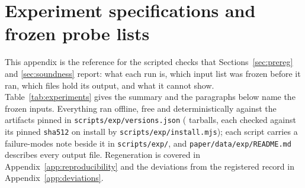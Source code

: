 \section{Experiment specifications and frozen probe lists}
\label{app:experiments}

This appendix is the reference for the scripted checks that Sections~\ref{sec:prereg} and \ref{sec:soundness} report: what each run is, which input list was frozen before it ran, which files hold its output, and what it cannot show. Table~\ref{tab:experiments} gives the summary and the paragraphs below name the frozen inputs. Everything ran offline, free and deterministically against the artifacts pinned in \texttt{scripts/exp/versions.json} (\expArtifacts{} tarballs, each checked against its pinned \texttt{sha512} on install by \texttt{scripts/exp/install.mjs}); each script carries a failure-modes note beside it in \texttt{scripts/exp/}, and \texttt{paper/data/exp/README.md} describes every output file. Regeneration is covered in Appendix~\ref{app:reproducibility} and the deviations from the registered record in Appendix~\ref{app:deviations}.

